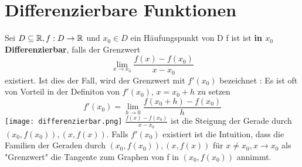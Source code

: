 \section{Differenzierbare Funktionen}
 Sei \( D \subseteq \mathbb{R} , f: D \rightarrow \mathbb{R} \) und \(x_0 \in D\) ein Häufungspunkt von D \newline
f ist ist \textbf{in \(x_0\) Differenzierbar}, falls der Grenzwert
\[ \lim\limits_{x \rightarrow x_0} \frac{f(x) - f(x_0)}{x - x_0}\]
existiert. Ist dies der Fall, wird der Grenzwert mit \(f'(x_0)\) bezeichnet \newline
{}: Es ist oft von Vorteil in der Definiton von \(f'(x_0)\), \(x = x_0 +h\) zu setzen \[f'(x_0) = \lim_{h \rightarrow 0} \frac{f(x_0+h)-f(x_0)}{h}\]
\texttt{[image: differenzierbar.png]} \newline
\( \frac{f(x) - f(x_0)}{x - x_0}\) ist die Steigung der Gerade durch \((x_0, f(x_0)), (x,f(x))\). Falls \(f'(x_0)\) existiert ist die Intuition, dass die Familien der Geraden durch \((x_0, f(x_0)), (x,f(x))\) für \(x \neq x_0, x \rightarrow x_0\) als "Grenzwert" die Tangente zum Graphen von f in \((x_0, f(x_0))\) annimmt.
